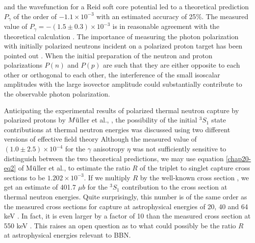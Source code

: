 and the wavefunction for a Reid soft core potential led to a theoretical prediction $P_\gamma $ of the order of $-1.1 \times 10^{-3}$ with an estimated accuracy of 25$\%$. The measured value \cite{key37} of $P_\gamma =-(1.5 \pm 0.3)\times 10^{-3}$ is in reasonable agreement with the theoretical calculation \cite{key36}. The importance of measuring the photon polarization with initially polarized neutrons incident on a polarized proton target has been pointed out \cite{key38}. When the initial preparation of the neutron and proton polarizations $P(n)$ and $P(p)$ are such that they are either opposite to each other or orthogonal to each other, the interference of the small isoscalar amplitudes with the large isovector amplitude could substantially contribute to the observable photon polarization.

Anticipating the experimental results of polarized thermal neutron capture by polarized protons by $M\ddot{\rm u}$ller et al., \cite{key39}, the possibility of the initial $^3S_1$ state contributions at thermal neutron energies was discussed using two different versions of effective field theory \cite{key40,key41} Although the measured value of $(1.0\pm 2.5)\times 10^{-4}$ for the $\gamma$ anisotropy $\eta$ was not sufficiently sensitive to distinguish between the two theoretical predictions, we may use equation \eqref{chap20-eq2} of M$\ddot{\rm u}$ller et al., \cite{key39} to estimate the ratio $R$ of the triplet to singlet capture cross sections to be $1.202 \times 10^{-3} $. If we multiply $R$ by the well-known cross section  \cite{key22}, we get an estimate of 401.7 $\mu b$ for the $^3S_1$ contribution to the cross section at thermal neutron energies. Quite surprisingly, this number is of the same order as the measured cross sections for capture at astrophysical energies of 20, 40 and 64 keV \cite{key20}. In fact, it is even larger by a factor of 10 than the measured cross section at 550 keV \cite{key21}. This raises an open question as to what could possibly be the ratio $R$ at astrophysical energies relevant to BBN. 

